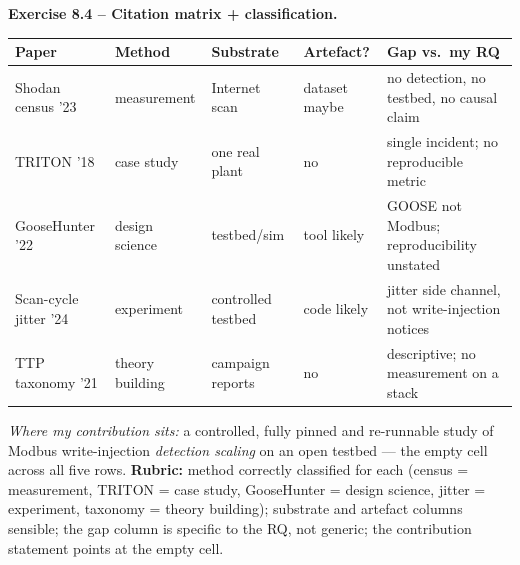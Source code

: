 \documentclass[11pt,a4paper]{article}
\begin{document}
\begin{solutionbox}
\textbf{Exercise 8.4 -- Citation matrix + classification.}
\vspace{0.5mm}
{\footnotesize
\par\begin{tabular}{@{}p{3.1cm}p{2.4cm}p{2.6cm}p{1.8cm}p{3.8cm}@{}}
\toprule
\textbf{Paper} & \textbf{Method} & \textbf{Substrate} & \textbf{Artefact?} & \textbf{Gap vs.\ my RQ} \\
\midrule
Shodan census '23 & measurement & Internet scan & dataset maybe & no detection, no testbed, no causal claim \\
TRITON '18 & case study & one real plant & no & single incident; no reproducible metric \\
GooseHunter '22 & design science & testbed/sim & tool likely & GOOSE not Modbus; reproducibility unstated \\
Scan-cycle jitter '24 & experiment & controlled testbed & code likely & jitter side channel, not write-injection notices \\
TTP taxonomy '21 & theory building & campaign reports & no & descriptive; no measurement on a stack \\
\bottomrule
\end{tabular}}
\vspace{0.5mm}
\textit{Where my contribution sits:} a controlled, fully pinned and re-runnable
study of Modbus write-injection \emph{detection scaling} on an open testbed --- the
empty cell across all five rows.
\textbf{Rubric:} method correctly classified for each (census = measurement, TRITON
= case study, GooseHunter = design science, jitter = experiment, taxonomy = theory
building); substrate and artefact columns sensible; the gap column is specific to
the RQ, not generic; the contribution statement points at the empty cell.
\end{solutionbox}
\end{document}
